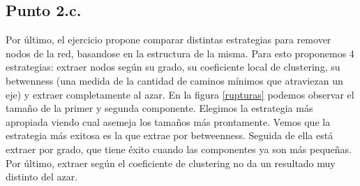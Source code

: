 \documentclass{article}
\begin{document}
\subsection{Punto 2.c.}
Por último, el ejercicio propone comparar distintas estrategias para remover nodos de la red, basandose en la estructura de la misma. Para esto proponemos 4 estrategias: extraer nodos según su grado, su coeficiente local de clustering, su betwenness (una medida de la cantidad de caminos mínimos que atraviezan un eje) y extraer completamente al azar. En la figura \ref{rupturas} podemos observar el tamaño de la primer y segunda componente. Elegimos la estrategia más apropiada viendo cual asemeja los tamaños más prontamente. Vemos que la estrategia más exitosa es la que extrae por betweenness. Seguida de ella está extraer por grado, que tiene éxito cuando las componentes ya son más pequeñas. Por último, extraer según el coeficiente de clustering no da un resultado muy distinto del azar.


\end{document}
